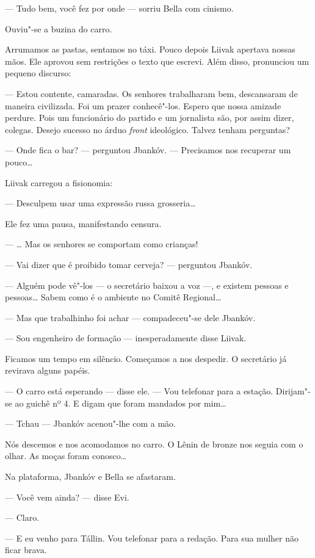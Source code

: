 --- Tudo bem, você fez por onde --- sorriu Bella com
cinismo.

Ouviu"-se a buzina do carro.

Arrumamos as pastas, sentamos no táxi. Pouco depois Liivak apertava
nossas mãos. Ele aprovou sem restrições o texto que escrevi. Além disso,
pronunciou um pequeno discurso:

--- Estou contente, camaradas. Os senhores trabalharam bem,
descansaram de maneira civilizada. Foi um prazer conhecê"-los. Espero que
nossa amizade perdure. Pois um funcionário do partido e um jornalista
são, por assim dizer, colegas. Desejo sucesso no árduo \emph{front}
ideológico. Talvez tenham perguntas?

--- Onde fica o bar? --- perguntou Jbankóv. ---
Precisamos nos recuperar um pouco\ldots{}

Liivak carregou a fisionomia:

--- Desculpem usar uma expressão russa grosseria\ldots{}

Ele fez uma pausa, manifestando censura.

--- \ldots{} Mas os senhores se comportam como crianças!

--- Vai dizer que é proibido tomar cerveja? --- perguntou
Jbankóv.

--- Alguém pode vê"-los --- o secretário baixou a voz
---, e existem pessoas e pessoas\ldots{} Sabem como é o ambiente no
Comitê Regional\ldots{}

--- Mas que trabalhinho foi achar --- compadeceu"-se dele
Jbankóv.

--- Sou engenheiro de formação --- inesperadamente disse
Liivak.

Ficamos um tempo em silêncio. Começamos a nos despedir. O secretário já
revirava alguns papéis.

--- O carro está esperando --- disse ele. --- Vou
telefonar para a estação. Dirijam"-se ao guichê nº 4. E digam que foram
mandados por mim\ldots{}

--- Tchau --- Jbankóv acenou"-lhe com a mão.

Nós descemos e nos acomodamos no carro. O Lênin de bronze nos seguia com
o olhar. As moças foram conosco\ldots{}

Na plataforma, Jbankóv e Bella se afastaram.

--- Você vem ainda? --- disse Evi.

--- Claro.

--- E eu venho para Tállin. Vou telefonar para a redação. Para
sua mulher não ficar brava.

